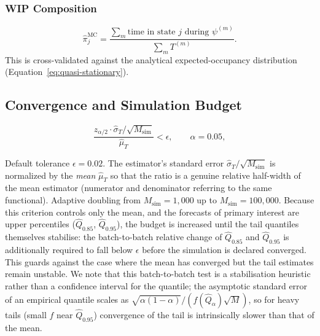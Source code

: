 \subsubsection{WIP Composition}

\begin{equation}
\label{eq:wip-composition}
\hat{\pi}_j^{\text{MC}} = \frac{\sum_m \text{time in state } j \text{ during } \psi^{(m)}}
    {\sum_m T^{(m)}}.
\end{equation}
This is cross-validated against the analytical expected-occupancy
distribution (Equation~\ref{eq:quasi-stationary}).


\subsection{Convergence and Simulation Budget}
\label{sec:s4-convergence}

\begin{definition}
\label{def:convergence}
\begin{equation}
\label{eq:convergence-criterion}
\frac{z_{\alpha/2} \cdot \hat{\sigma}_T / \sqrt{M_{\text{sim}}}}{\hat{\mu}_T}
    < \epsilon, \qquad \alpha = 0.05,
\end{equation}
\end{definition}

Default tolerance $\epsilon = 0.02$. The estimator's standard error
$\hat{\sigma}_T/\sqrt{M_{\text{sim}}}$ is normalized by the \emph{mean}
$\hat{\mu}_T$ so that the ratio is a genuine relative half-width of the mean
estimator (numerator and denominator referring to the same functional).
Adaptive doubling from $M_{\text{sim}} = 1{,}000$ up to $M_{\text{sim}} =
100{,}000$. Because this criterion controls only the mean, and the forecasts
of primary interest are upper percentiles ($\hat{Q}_{0.85}$,
$\hat{Q}_{0.95}$), the budget is increased until the tail quantiles
themselves stabilise: the batch-to-batch relative change of
$\hat{Q}_{0.85}$ and $\hat{Q}_{0.95}$ is additionally required to fall below
$\epsilon$ before the simulation is declared converged. This guards against
the case where the mean has converged but the tail estimates remain
unstable. We note that this batch-to-batch test is a stabilisation heuristic
rather than a confidence interval for the quantile; the asymptotic standard
error of an empirical quantile scales as
$\sqrt{\alpha(1-\alpha)}/(f(\hat{Q}_\alpha)\sqrt{M})$, so for heavy tails
(small $f$ near $\hat{Q}_{0.95}$) convergence of the tail is intrinsically
slower than that of the mean.

